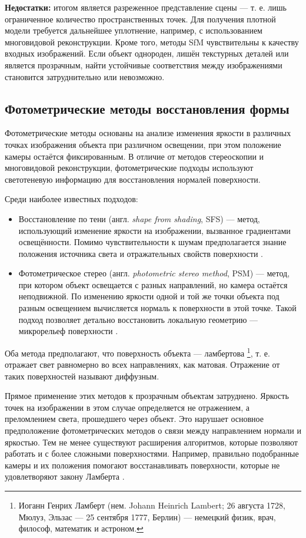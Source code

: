 \textbf{Недостатки:} итогом является разреженное представление сцены — т. е.
лишь ограниченное количество пространственных точек. Для получения плотной модели
требуется дальнейшее уплотнение, например, с использованием многовидовой
реконструкции. Кроме того, методы SfM чувствительны к качеству входных
изображений. Если объект однороден, лишён текстурных деталей или является
прозрачным, найти устойчивые соответствия между изображениями становится
затруднительно или невозможно.

\subsection{Фотометрические методы восстановления формы}

Фотометрические методы основаны на анализе изменения яркости в различных точках
изображения объекта при различном освещении, при этом положение камеры остаётся
фиксированным. В отличие от методов стереоскопии и многовидовой реконструкции,
фотометрические подходы используют светотеневую информацию для восстановления
нормалей поверхности.

Среди наиболее известных подходов:

\begin{itemize}
	\item Восстановление по тени (англ. \emph{shape from shading}, SFS) —
	метод, использующий изменение яркости на изображении, вызванное градиентами
	освещённости. Помимо чувствительности к шумам предполагается знание положения источника света и
	отражательных свойств поверхности \cite{Horn1989SFS}.
	\item Фотометрическое стерео (англ. \emph{photometric stereo method}, PSM) — метод, при котором
	объект освещается с разных направлений, но камера остаётся неподвижной. По
	изменению яркости одной и той же точки объекта под разным освещением
	вычисляется нормаль к поверхности в этой точке. Такой подход позволяет детально
	восстановить локальную геометрию — микрорельеф поверхности
	\cite{10.1117/12.7972479}.
\end{itemize}

Оба метода предполагают, что поверхность объекта — ламбертова \footnote{Иоганн
Генрих Ламберт (нем. Johann Heinrich Lambert; 26 августа 1728, Мюлуз, Эльзас —
25 сентября 1777, Берлин) — немецкий физик, врач, философ, математик и
астроном.}, т. е.  отражает свет равномерно во всех направлениях, как матовая.
Отражение от таких поверхностей называют диффузным.

Прямое применение этих методов к прозрачным объектам затруднено. Яркость точек
на изображении в этом случае определяется не отражением, а преломлением света,
прошедшего через объект. Это нарушает основное предположение фотометрических
методов о связи между направлением нормали и яркостью. Тем не менее существуют
расширения алгоритмов, которые позволяют работать и с более сложными поверхностями.
Например, правильно подобранные камеры и их положения помогают восстанавливать поверхности,
которые не удовлетворяют закону Ламберта \cite{McGunnigle-2012}.

